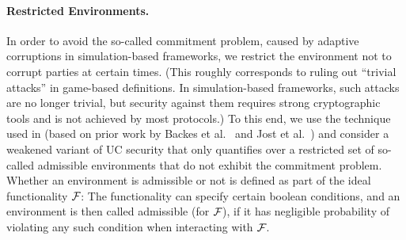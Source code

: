 \paragraph{Restricted Environments.}
In order to avoid the so-called commitment problem, caused by adaptive corruptions in simulation-based frameworks, we restrict the environment not to corrupt parties at certain times. (This roughly corresponds to ruling out ``trivial attacks'' in game-based definitions. In simulation-based frameworks, such attacks are no longer trivial, but security against them requires strong cryptographic tools and is not achieved by most protocols.)
%
To this end, we use the technique used in \cite{TCC:ACJM20} (based on prior work by Backes et al.~\cite{ESORICS:BDDK06} and Jost et al.~\cite{TCC:JosMauMul19}) and consider a weakened variant of UC security that only quantifies over a restricted set of so-called admissible environments that do not exhibit the commitment problem.
%
Whether an environment is admissible or not is defined as part of the ideal functionality $\mathcal{F}_{\normalfont\textsc{\relax}}$: The functionality can specify certain boolean conditions, and an environment is then called {admissible (for $\mathcal{F}_{\normalfont\textsc{\relax}}$)}, if it has negligible probability of violating any such condition when interacting with $\mathcal{F}_{\normalfont\textsc{\relax}}$.


